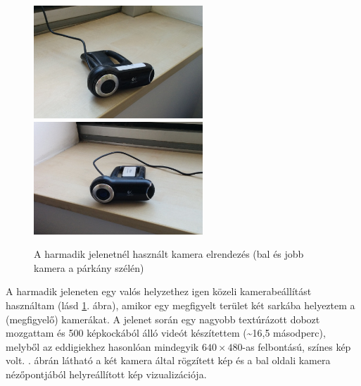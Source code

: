 \begin{figure}[b]
\centering
\includegraphics[width=180pt]{figures/scene3/scene3_cameraposeleft.jpg}\hspace{10pt}
\includegraphics[width=180pt]{figures/scene3/scene3_cameraposeright.jpg}
\caption{A harmadik jelenetnél használt kamera elrendezés (bal és jobb kamera a párkány szélén) \label{fig:scene3_camerapose}}
\end{figure}

A harmadik jeleneten egy valós helyzethez igen közeli kamerabeállítást használtam (lásd \ref{fig:scene3_camerapose}. ábra), amikor egy megfigyelt terület két sarkába helyeztem a (megfigyelő) kamerákat. A jelenet során egy nagyobb textúrázott dobozt mozgattam és 500 képkockából álló videót készítettem (\textasciitilde 16,5 másodperc), melyből az eddigiekhez hasonlóan mindegyik $640\times 480$-as felbontású, színes kép volt. . ábrán látható a két kamera által rögzített kép és a bal oldali kamera nézőpontjából helyreállított kép vizualizációja.

